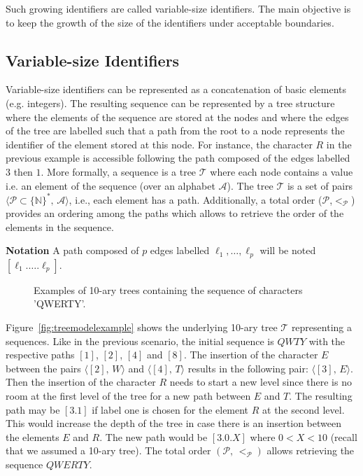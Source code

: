  Such growing identifiers are called variable-size
identifiers. The main objective is to keep the growth of the size of the
identifiers under acceptable boundaries.

\subsection{Variable-size Identifiers}

Variable-size identifiers can be represented as a concatenation of basic
elements (e.g. integers). The resulting sequence can be represented by a tree
structure where the elements of the sequence are stored at the nodes and where
the edges of the tree are labelled such that a path from the root to a node
represents the identifier of the element stored at this node. For instance, the
character $R$ in the previous example is accessible following the path composed
of the edges labelled $3$ then $1$. More formally, a sequence is a tree
$\mathcal{T}$ where each node contains a value i.e. an element of the sequence
(over an alphabet $\mathcal{A}$). The tree $\mathcal{T}$ is a set of pairs
$\langle\mathcal{P}\subset\{\mathbb{N}\}^*,\, \mathcal{A} \rangle$, i.e., each
element has a path. Additionally, a total order
($\mathcal{P}$,$<_{\mathcal{P}}$) provides an ordering among the paths which
allows to retrieve the order of the elements in the sequence.

\noindent \textbf{Notation} A path composed of $p$ edges labelled
$\ell_1,\ldots,\ell_p$ will be noted $[\ell_1.\ldots.\ell_p]$.

\begin{figure*}
  \centering
  \hspace{20pt}
  \caption{\label{fig:treeexample} Examples of 10-ary trees containing the
    sequence of characters 'QWERTY'.}
\end{figure*}


Figure~\ref{fig:treemodelexample} shows the underlying 10-ary tree
$\mathcal{T}$ representing a sequences. Like in the previous scenario, the
initial sequence is $QWTY$ with the respective paths $[1]$, $[2]$, $[4]$ and
$[8]$. The insertion of the character $E$ between the pairs
$\langle [2],\, W\rangle$ and $\langle [4],\, T\rangle$ results in the
following pair: $\langle [3],\, E \rangle$. Then the insertion of the character
$R$ needs to start a new level since there is no room at the first level of the
tree for a new path between $E$ and $T$. The resulting path may be $[3.1]$ if
label one is chosen for the element $R$ at the second level. This would
increase the depth of the tree in case there is an insertion between the
elements $E$ and $R$. The new path would be $[3.0.X]$ where $0<X<10$ (recall
that we assumed a 10-ary tree). The total order $(\mathcal{P},\,<_\mathcal{P})$
allows retrieving the sequence $QWERTY$.

